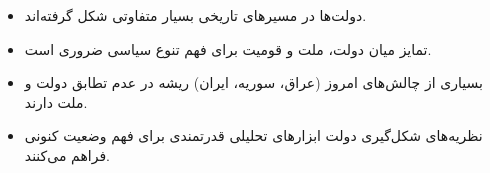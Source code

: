 \simplesep

\begin{lessonbox}
\begin{itemize}
  \item دولت‌ها در مسیرهای تاریخی بسیار متفاوتی شکل گرفته‌اند.
  \item تمایز میان دولت، ملت و قومیت برای فهم تنوع سیاسی ضروری است.
  \item بسیاری از چالش‌های امروز (عراق، سوریه، ایران) ریشه در عدم تطابق دولت و ملت دارند.
  \item نظریه‌های شکل‌گیری دولت ابزارهای تحلیلی قدرتمندی برای فهم وضعیت کنونی فراهم می‌کنند.
\end{itemize}
\end{lessonbox}